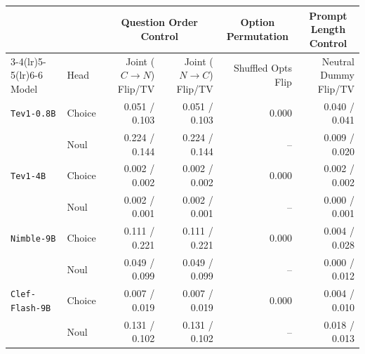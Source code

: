 \begin{tabular}{llrrrr}
\toprule
 & & \multicolumn{2}{c}{Question Order Control} & \multicolumn{1}{c}{Option Permutation} & \multicolumn{1}{c}{Prompt Length Control} \\
\cmidrule(lr){3-4}\cmidrule(lr){5-5}\cmidrule(lr){6-6}
Model & Head & Joint ($C \to N$) Flip/TV & Joint ($N \to C$) Flip/TV & Shuffled Opts Flip & Neutral Dummy Flip/TV \\
\midrule
\texttt{Tev1-0.8B} & Choice & 0.051 / 0.103 & 0.051 / 0.103 & 0.000 & 0.040 / 0.041 \\
 & Noul & 0.224 / 0.144 & 0.224 / 0.144 & -- & 0.009 / 0.020 \\
\midrule
\texttt{Tev1-4B} & Choice & 0.002 / 0.002 & 0.002 / 0.002 & 0.000 & 0.002 / 0.002 \\
 & Noul & 0.002 / 0.001 & 0.002 / 0.001 & -- & 0.000 / 0.001 \\
\midrule
\texttt{Nimble-9B} & Choice & 0.111 / 0.221 & 0.111 / 0.221 & 0.000 & 0.004 / 0.028 \\
 & Noul & 0.049 / 0.099 & 0.049 / 0.099 & -- & 0.000 / 0.012 \\
\midrule
\texttt{Clef-Flash-9B} & Choice & 0.007 / 0.019 & 0.007 / 0.019 & 0.000 & 0.004 / 0.010 \\
 & Noul & 0.131 / 0.102 & 0.131 / 0.102 & -- & 0.018 / 0.013 \\
\bottomrule
\end{tabular}
